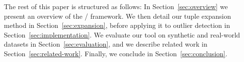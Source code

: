 The rest of this paper is structured as follows: In Section~\ref{sec:overview} we present an overview of the \dBoost/ framework. We then detail our tuple expansion method in Section~\ref{sec:expansion}, before applying it to outlier detection in Section~\ref{sec:implementation}. We evaluate our tool on synthetic and real-world datasets in Section~\ref{sec:evaluation}, and we describe related work in Section~\ref{sec:related-work}. Finally, we conclude in Section~\ref{sec:conclusion}. %
